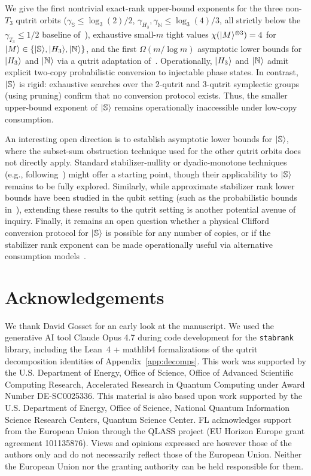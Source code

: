\documentclass[11pt]{article}
\theoremstyle{definition}
\newcommand{\microspace}{\mspace{0.5mu}}
\newcommand{\ket}[1]{\lvert\microspace #1 \microspace \rangle}
\newcommand{\chiR}{\chi}
\newcommand{\Strange}{\ket{\mathbb{S}}}
\newcommand{\Hth}{\ket{H_3}}
\newcommand{\Norrell}{\ket{\mathbb{N}}}
\begin{document}
	We give the first nontrivial exact-rank upper-bound exponents for
	the three non-$T_3$ qutrit orbits ($\gamma_{\mathbb{S}} \le \log_3(2)/2$,
	$\gamma_{H_3}, \gamma_{\mathbb{N}} \le \log_3(4)/3$, all strictly
	below the $\gamma_{T_3} \le 1/2$ baseline
	of~\cite{kocia2021improved}), exhaustive small-$m$ tight values
	$\chiR(\ket M^{\otimes 3}) = 4$ for $\ket M \in \{\Strange, \Hth,
	\Norrell\}$, and the first $\Omega(m/\log m)$ asymptotic lower
	bounds for $\Hth$ and $\Norrell$ via a qutrit adaptation
	of~\cite{lovitz2022techniques}. Operationally, $\Hth$ and
	$\Norrell$ admit explicit two-copy probabilistic conversion to
	injectable phase states. In contrast, $\Strange$ is rigid:
	exhaustive searches over the 2-qutrit and 3-qutrit symplectic groups
	(using pruning) confirm that no conversion protocol exists.
	Thus, the smaller upper-bound exponent of $\Strange$ remains
	operationally inaccessible under low-copy consumption.

	An interesting open direction is to establish asymptotic lower bounds
	for $\Strange$, where the subset-sum obstruction technique
	used for the other qutrit orbits does not directly apply.
	Standard stabilizer-nullity or dyadic-monotone techniques
	(e.g., following~\cite{beverland2020lower}) might offer a starting
	point, though their applicability to $\Strange$ remains to be
	fully explored. Similarly, while approximate stabilizer rank lower
	bounds have been studied in the qubit setting (such as the
	probabilistic bounds in~\cite{mehraban2023quadratic}), extending
	these results to the qutrit setting is another potential avenue of
	inquiry. Finally, it remains an open question whether a physical
	Clifford conversion protocol for $\Strange$ is possible for any
	number of copies, or if the stabilizer rank exponent can be made
	operationally useful via alternative consumption models~\cite{raussendorf2001one,
	hall2007cluster, booth2021outcome, mackeprang2022power}.
	
	\section*{Acknowledgements}

	We thank David Gosset for an early look at the manuscript. We used
	the generative AI tool Claude Opus 4.7 during code development for
	the \texttt{stabrank} library, including the Lean~4 + mathlib4
	formalizations of the qutrit decomposition identities of
	Appendix~\ref{app:decomps}. This work was supported by the U.S.
	Department of Energy, Office of Science, Office of Advanced
	Scientific Computing Research, Accelerated Research in Quantum
	Computing under Award Number DE-SC0025336. This material is also
	based upon work supported by the U.S. Department of Energy, Office
	of Science, National Quantum Information Science Research Centers,
	Quantum Science Center. FL acknowledges support from the European
	Union through the QLASS project (EU Horizon Europe grant agreement
	101135876). Views and opinions expressed are however those of the
	authors only and do not necessarily reflect those of the European
	Union. Neither the European Union nor the granting authority can be
	held responsible for them.
	
\end{document}
